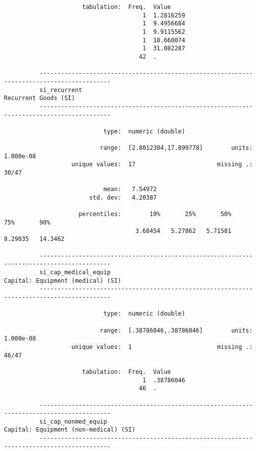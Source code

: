 \documentclass{article}
\begin{document}
\begin{verbatim}
                      tabulation:  Freq.  Value
                                       1  1.2816259
                                       1  9.4956684
                                       1  9.9115562
                                       1  18.660074
                                       1  31.082287
                                      42  .
          
          ------------------------------------------------------------------------------------------
          si_recurrent                                                          Recurrent Goods (SI)
          ------------------------------------------------------------------------------------------
          
                            type:  numeric (double)
          
                           range:  [2.8012304,17.899778]        units:  1.000e-08
                   unique values:  17                       missing .:  30/47
          
                            mean:   7.54972
                        std. dev:   4.20387
          
                     percentiles:        10%       25%       50%       75%       90%
                                     3.68454   5.27862   5.71581   8.29035   14.3462
          
          ------------------------------------------------------------------------------------------
          si_cap_medical_equip                                     Capital: Equipment (medical) (SI)
          ------------------------------------------------------------------------------------------
          
                            type:  numeric (double)
          
                           range:  [.38786046,.38786046]        units:  1.000e-08
                   unique values:  1                        missing .:  46/47
          
                      tabulation:  Freq.  Value
                                       1  .38786046
                                      46  .
          
          ------------------------------------------------------------------------------------------
          si_cap_nonmed_equip                                  Capital: Equipment (non-medical) (SI)
          ------------------------------------------------------------------------------------------
          

\end{verbatim}
\end{document}
